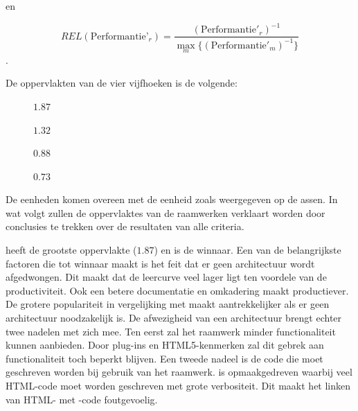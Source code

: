 en

\begin{equation}
  REL(\text{Performantie'}_r)= \frac{\left(\text{Performantie}'_r\right)^{-1}}{\max_{m}\{\left(\text{Performantie}'_m\right)^{-1}\}}
  \label{eq:rel-performantie-final}
\end{equation}.

De oppervlakten van de vier vijfhoeken is de volgende:
\begin{description}
 \item [\jqm{}] $1.87$
 \item [\kendo{}] $1.32$
 \item [\lungo{}] $0.88$
 \item [\st{}] $0.73$
\end{description}

De eenheden komen overeen met de eenheid zoals weergegeven op de assen.
In wat volgt zullen de oppervlaktes van de raamwerken verklaart worden door conclusies te trekken over de resultaten van alle criteria.


\jqm{} heeft de grootste oppervlakte ($1.87$) en is de winnaar.
Een van de belangrijkste factoren die \jqm{} tot winnaar maakt is het feit dat er geen architectuur wordt afgedwongen.
Dit maakt dat de leercurve veel lager ligt ten voordele van de productiviteit.
Ook een betere documentatie en omkadering maakt \jqm{} productiever.
De grotere populariteit in vergelijking met \lungo{} maakt \jqm{} aantrekkelijker als er geen architectuur noodzakelijk is.
De afwezigheid van een architectuur brengt echter twee nadelen met zich mee.
Ten eerst zal het raamwerk minder functionaliteit kunnen aanbieden.
Door plug-ins en HTML5-kenmerken zal dit gebrek aan functionaliteit toch beperkt blijven.
Een tweede nadeel is de code die moet geschreven worden bij gebruik van het \jqm{} raamwerk.
\jqm{} is opmaakgedreven waarbij veel HTML-code moet worden geschreven met grote verbositeit.
Dit maakt het linken van HTML- met \js{}-code foutgevoelig.


